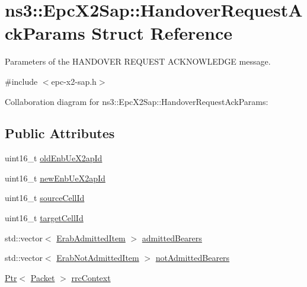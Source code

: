 \hypertarget{structns3_1_1EpcX2Sap_1_1HandoverRequestAckParams}{}\section{ns3\+:\+:Epc\+X2\+Sap\+:\+:Handover\+Request\+Ack\+Params Struct Reference}
\label{structns3_1_1EpcX2Sap_1_1HandoverRequestAckParams}


Parameters of the H\+A\+N\+D\+O\+V\+ER R\+E\+Q\+U\+E\+ST A\+C\+K\+N\+O\+W\+L\+E\+D\+GE message.  




{\ttfamily \#include $<$epc-\/x2-\/sap.\+h$>$}



Collaboration diagram for ns3\+:\+:Epc\+X2\+Sap\+:\+:Handover\+Request\+Ack\+Params\+:
\subsection*{Public Attributes}
\begin{DoxyCompactItemize}
\item 
uint16\+\_\+t \hyperlink{structns3_1_1EpcX2Sap_1_1HandoverRequestAckParams_ad88c2a1072987845fbc97b6664db22d6}{old\+Enb\+Ue\+X2ap\+Id}
\item 
uint16\+\_\+t \hyperlink{structns3_1_1EpcX2Sap_1_1HandoverRequestAckParams_a3e6d78a33d90a6fede9f0ce2905ae9e3}{new\+Enb\+Ue\+X2ap\+Id}
\item 
uint16\+\_\+t \hyperlink{structns3_1_1EpcX2Sap_1_1HandoverRequestAckParams_a2e1cb3aafe8340681bcf081203999a79}{source\+Cell\+Id}
\item 
uint16\+\_\+t \hyperlink{structns3_1_1EpcX2Sap_1_1HandoverRequestAckParams_a6a9aedc6c364d4f14d01c6bf22423f15}{target\+Cell\+Id}
\item 
std\+::vector$<$ \hyperlink{structns3_1_1EpcX2Sap_1_1ErabAdmittedItem}{Erab\+Admitted\+Item} $>$ \hyperlink{structns3_1_1EpcX2Sap_1_1HandoverRequestAckParams_a02f7bbe9f69242497489bcea0f36ed03}{admitted\+Bearers}
\item 
std\+::vector$<$ \hyperlink{structns3_1_1EpcX2Sap_1_1ErabNotAdmittedItem}{Erab\+Not\+Admitted\+Item} $>$ \hyperlink{structns3_1_1EpcX2Sap_1_1HandoverRequestAckParams_a0006ab01be695b068ae71cb63373345a}{not\+Admitted\+Bearers}
\item 
\hyperlink{classns3_1_1Ptr}{Ptr}$<$ \hyperlink{classns3_1_1Packet}{Packet} $>$ \hyperlink{structns3_1_1EpcX2Sap_1_1HandoverRequestAckParams_adb0428fcc16cda04e5ba8ae8779821bf}{rrc\+Context}
\end{DoxyCompactItemize}


